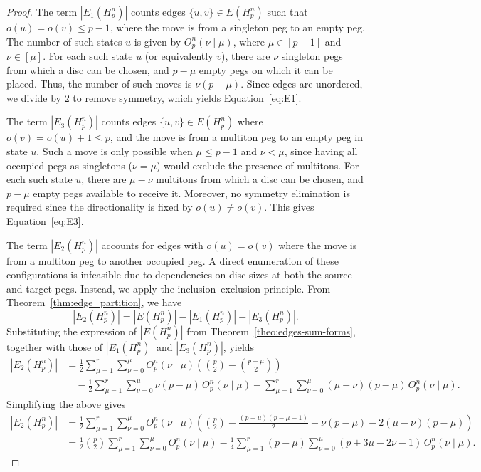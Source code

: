 \documentclass[letterpaper,12pt]{article}
\begin{document}
\begin{proof}
The term $|E_1(H_p^n)|$ counts edges $\{u, v\} \in E(H_p^n)$ such that $o(u) = o(v) \leq p - 1$, where the move is from a singleton peg to an empty peg.  
The number of such states $u$ is given by $O_p^n(\nu \mid \mu)$, where $\mu \in [p - 1]$ and $\nu \in [\mu]$.  
For each such state $u$ (or equivalently $v$), there are $\nu$ singleton pegs from which a disc can be chosen, and $p - \mu$ empty pegs on which it can be placed.  
Thus, the number of such moves is $\nu (p - \mu)$.  
Since edges are unordered, we divide by $2$ to remove symmetry, which yields Equation~\eqref{eq:E1}.

The term $|E_3(H_p^n)|$ counts edges $\{u, v\} \in E(H_p^n)$ where $o(v) = o(u) + 1 \leq p$, and the move is from a multiton peg to an empty peg in state $u$.  
Such a move is only possible when $\mu \leq p - 1$ and $\nu < \mu$, since having all occupied pegs as singletons ($\nu = \mu$) would exclude the presence of multitons.  
For each such state $u$, there are $\mu - \nu$ multitons from which a disc can be chosen, and $p - \mu$ empty pegs available to receive it.  
Moreover, no symmetry elimination is required since the directionality is fixed by $o(u) \neq o(v)$.  
This gives Equation~\eqref{eq:E3}.

The term $|E_2(H_p^n)|$ accounts for edges with $o(u) = o(v)$ where the move is from a multiton peg to another occupied peg.  
A direct enumeration of these configurations is infeasible due to dependencies on disc sizes at both the source and target pegs.  
Instead, we apply the inclusion–exclusion principle.  
From Theorem~\ref{thm:edge_partition}, we have
\[
|E_2(H_p^n)| = |E(H_p^n)| - |E_1(H_p^n)| - |E_3(H_p^n)|.
\]
Substituting the expression of $|E(H_p^n)|$ from Theorem~\ref{theo:edges-sum-forms}, together with those of $|E_1(H_p^n)|$ and $|E_3(H_p^n)|$, yields
\begin{align*}
    |E_2(H_p^n)| &= \frac{1}{2} \sum_{\mu = 1}^{r} \sum_{\nu = 0}^{\mu} 
    O_p^n(\nu \mid \mu) \!\left( \binom{p}{2} - \binom{p - \mu}{2} \right) \\
    &\quad - \frac{1}{2} \sum_{\mu = 1}^{r} \sum_{\nu = 0}^{\mu} 
    \nu (p - \mu)\, O_p^n(\nu \mid \mu)
    - \sum_{\mu = 1}^{r} \sum_{\nu = 0}^{\mu} 
    (\mu - \nu)(p - \mu)\, O_p^n(\nu \mid \mu).
\end{align*}
Simplifying the above gives
\begin{align*}
    |E_2(H_p^n)| &= 
    \frac{1}{2} \sum_{\mu = 1}^{r} \sum_{\nu = 0}^{\mu} 
    O_p^n(\nu \mid \mu)
    \left( 
        \binom{p}{2} - \frac{(p - \mu)(p - \mu - 1)}{2} 
        - \nu(p - \mu) - 2(\mu - \nu)(p - \mu)
    \right) \\
    &= 
    \frac{1}{2} \binom{p}{2} 
    \sum_{\mu = 1}^{r} \sum_{\nu = 0}^{\mu} 
    O_p^n(\nu \mid \mu)
    - 
    \frac{1}{4} \sum_{\mu = 1}^{r} (p - \mu) 
    \sum_{\nu = 0}^{\mu} 
    (p + 3\mu - 2\nu - 1)\, O_p^n(\nu \mid \mu).
\end{align*}


\end{proof}
\end{document}
